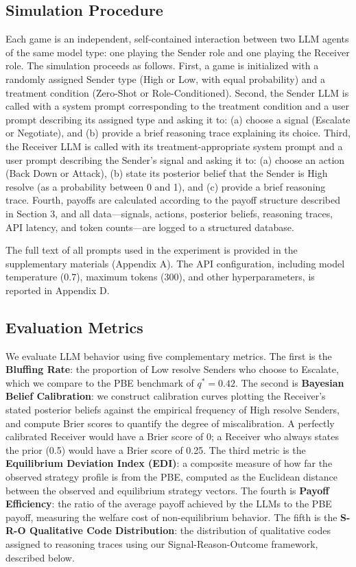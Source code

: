\documentclass[12pt]{article}
\theoremstyle{plain}
\theoremstyle{definition}
\begin{document}
\subsection{Simulation Procedure}

Each game is an independent, self-contained interaction between two LLM agents of the same model type: one playing the Sender role and one playing the Receiver role. The simulation proceeds as follows. First, a game is initialized with a randomly assigned Sender type (High or Low, with equal probability) and a treatment condition (Zero-Shot or Role-Conditioned). Second, the Sender LLM is called with a system prompt corresponding to the treatment condition and a user prompt describing its assigned type and asking it to: (a) choose a signal (Escalate or Negotiate), and (b) provide a brief reasoning trace explaining its choice. Third, the Receiver LLM is called with its treatment-appropriate system prompt and a user prompt describing the Sender's signal and asking it to: (a) choose an action (Back Down or Attack), (b) state its posterior belief that the Sender is High resolve (as a probability between 0 and 1), and (c) provide a brief reasoning trace. Fourth, payoffs are calculated according to the payoff structure described in Section 3, and all data---signals, actions, posterior beliefs, reasoning traces, API latency, and token counts---are logged to a structured database.

The full text of all prompts used in the experiment is provided in the supplementary materials (Appendix A). The API configuration, including model temperature (0.7), maximum tokens (300), and other hyperparameters, is reported in Appendix D.

\subsection{Evaluation Metrics}

We evaluate LLM behavior using five complementary metrics. The first is the \textbf{Bluffing Rate}: the proportion of Low resolve Senders who choose to Escalate, which we compare to the PBE benchmark of $q^* = 0.42$. The second is \textbf{Bayesian Belief Calibration}: we construct calibration curves plotting the Receiver's stated posterior beliefs against the empirical frequency of High resolve Senders, and compute Brier scores to quantify the degree of miscalibration. A perfectly calibrated Receiver would have a Brier score of 0; a Receiver who always states the prior (0.5) would have a Brier score of 0.25. The third metric is the \textbf{Equilibrium Deviation Index (EDI)}: a composite measure of how far the observed strategy profile is from the PBE, computed as the Euclidean distance between the observed and equilibrium strategy vectors. The fourth is \textbf{Payoff Efficiency}: the ratio of the average payoff achieved by the LLMs to the PBE payoff, measuring the welfare cost of non-equilibrium behavior. The fifth is the \textbf{S-R-O Qualitative Code Distribution}: the distribution of qualitative codes assigned to reasoning traces using our Signal-Reason-Outcome framework, described below.
\end{document}
